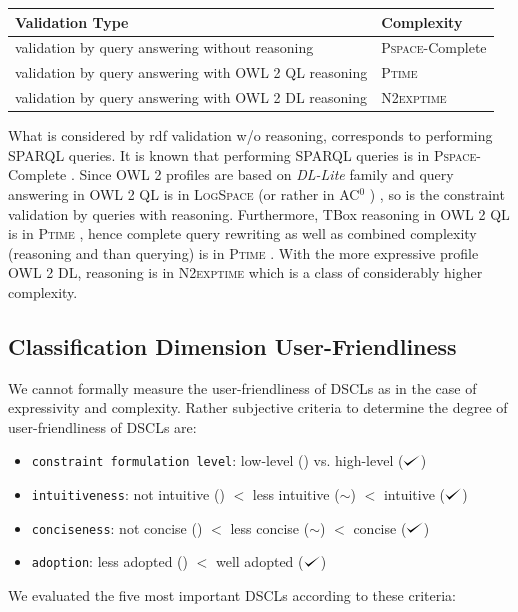 \documentclass{llncs}
\newcommand{\ms}[1]{\texttt{#1}}
\def\checkmark{\tikz\fill[scale=0.4](0,.35) -- (.25,0) -- (1,.7) -- (.25,.15) -- cycle;}
\newenvironment{complexity}{
  \scriptsize
  \sffamily
  \vspace{0.3cm}
  \begin{tabular}{l|l}
  \hline
  \textbf{Validation Type} & \textbf{Complexity} \\
  \hline

}{
  \hline
  \end{tabular}
  \linebreak
}
\begin{document}
\begin{complexity}
validation by query answering without reasoning & \textsc{Pspace}-Complete \\
validation by query answering with OWL 2 QL reasoning & \textsc{Ptime} \\
validation by query answering with OWL 2 DL reasoning & \textsc{N2exptime} \\
\end{complexity}

What is considered by rdf validation w/o reasoning, corresponds to performing SPARQL queries.  It is known that performing SPARQL queries is in \textsc{Pspace}-Complete \cite{Perez2009}. Since OWL 2 profiles are based on \textit{DL-Lite} family and query answering in OWL 2 QL is in \textsc{LogSpace} (or rather in AC$^0$ ) \cite{Calvanese2007}, so is the constraint validation by queries with  reasoning. Furthermore, TBox reasoning in OWL 2 QL is in \textsc{Ptime} \cite{Calvanese2007}, hence complete query rewriting as well as combined complexity (reasoning and than querying) is in \textsc{Ptime} \cite{Artale2009,Calvanese2007}.  With the more expressive profile OWL 2 DL, reasoning is in \textsc{N2exptime} \cite{owl2profiles2008} which is a class of considerably higher complexity.

\subsection{Classification Dimension User-Friendliness}

We cannot formally measure the user-friendliness of DSCLs as in the case of expressivity and complexity. 
Rather subjective criteria to determine the degree of user-friendliness of DSCLs are:

\begin{itemize}
	\item \ms{constraint formulation level}: low-level () vs. high-level ($\checkmark$)
	\item \ms{intuitiveness}: not intuitive () $<$ less intuitive ($\sim$) $<$ intuitive ($\checkmark$)
	\item \ms{conciseness}: not concise () $<$ less concise ($\sim$) $<$ concise ($\checkmark$)
	\item \ms{adoption}: less adopted () $<$ well adopted ($\checkmark$)
\end{itemize}

We evaluated the five most important DSCLs according to these criteria:
\end{document}
